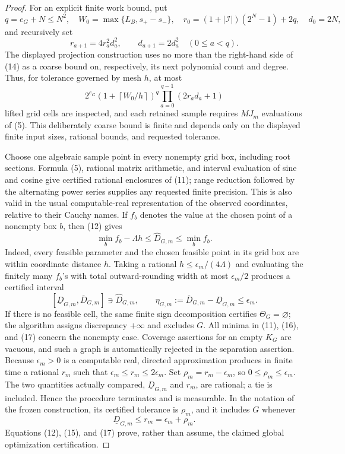 \documentclass{article}
\begin{document}
\begin{proof}
For an explicit finite work bound, put
\[
 q=e_G+N\leq N^2,
 \quad W_0=\max\{L_B,s_+-s_-\},
 \quad r_0=(1+|\mathcal I|)(2^N-1)+2q,
 \quad d_0=2N,
\]
and recursively set
\[
 r_{a+1}=4r_a^2d_a^2,
 \qquad d_{a+1}=2d_a^2
 \quad(0\leq a<q).
 \tag{14}
\]
The displayed projection construction uses no more than the right-hand side
of (14) as a coarse bound on, respectively, its next polynomial count and
degree.  Thus, for tolerance governed by mesh \(h\), at most
\[
 2^{e_G}\left(1+\left\lceil W_0/h\right\rceil\right)^q
 \prod_{a=0}^{q-1}(2r_ad_a+1)
 \tag{15}
\]
lifted grid cells are inspected, and each retained sample requires \(MJ_m\)
evaluations of (5).  This deliberately coarse bound is finite and depends
only on the displayed finite input sizes, rational bounds, and requested
tolerance.

Choose one algebraic sample point in every nonempty grid box, including root
sections.  Formula (5), rational matrix arithmetic, and interval evaluation
of sine and cosine give certified rational enclosures of (11); range reduction
followed by the alternating power series supplies any requested finite
precision.  This is also valid in the usual computable-real representation
of the observed coordinates, relative to their Cauchy names.  If
\(f_b\) denotes the value at the chosen point of a nonempty box \(b\), then
(12) gives
\[
 \min_b f_b-\Lambda h
 \leq \widehat D_{G,m}\leq\min_b f_b.
 \tag{16}
\]
Indeed, every feasible parameter and the chosen feasible point in its grid
box are within coordinate distance \(h\).  Taking a rational
\(h\leq\epsilon_m/(4\Lambda)\) and evaluating the finitely many \(f_b\)'s
with total outward-rounding width at most \(\epsilon_m/2\) produces a
certified interval
\[
 [\underline D_{G,m},\overline D_{G,m}]
 \ni\widehat D_{G,m},
 \qquad
 \eta_{G,m}:=\overline D_{G,m}-\underline D_{G,m}\leq\epsilon_m.
 \tag{17}
\]
If there is no feasible cell, the same finite sign decomposition certifies
\(\Theta_G=\varnothing\); the algorithm assigns discrepancy \(+\infty\) and
excludes \(G\).  All minima in (11), (16), and (17) concern the nonempty case.
Coverage assertions for an empty \(K_G\) are vacuous, and such a graph is
automatically rejected in the separation assertion.
Because \(\epsilon_m>0\) is a computable real, directed approximation produces
in finite time a rational \(r_m\) such that
\(\epsilon_m\leq r_m\leq2\epsilon_m\).  Set
\(\rho_m=r_m-\epsilon_m\), so \(0\leq\rho_m\leq\epsilon_m\).  The two
quantities actually compared, \(\underline D_{G,m}\) and \(r_m\), are
rational; a tie is included.  Hence the procedure terminates and is
measurable.  In the notation of the frozen construction, its certified
tolerance is \(\rho_m\), and it includes \(G\) whenever
\[
 \underline D_{G,m}\leq r_m=\epsilon_m+\rho_m.
 \tag{18}
\]
Equations (12), (15), and (17) prove, rather than assume, the claimed global
optimization certification.


\end{proof}
\end{document}

